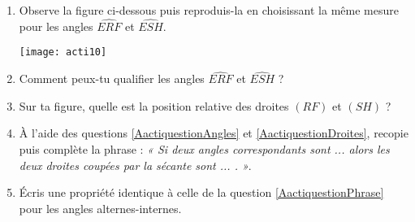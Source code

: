 \begin{activite}
\begin{enumerate}
\item Observe la figure ci-dessous puis reproduis-la en choisissant la même mesure pour les angles $\widehat{ERF}$ et $\widehat{ESH}$.

\begin{center}
\texttt{[image: acti10]}
\end{center}

\item\label{AactiquestionAngles} Comment peux-tu qualifier les angles $\widehat{ERF}$ et $\widehat{ESH}$ ? 
\item\label{AactiquestionDroites} Sur ta figure, quelle est la position relative des droites $(RF)$ et $(SH)$ ?
\item\label{AactiquestionPhrase} À l'aide des questions \ref{AactiquestionAngles} et \ref{AactiquestionDroites}, recopie puis complète la phrase : \textsl{« Si deux angles correspondants sont ... alors les deux droites coupées par la sécante sont ... . »}.
\item Écris une propriété identique à celle de la question \ref{AactiquestionPhrase} pour les angles alternes-internes.
\end{enumerate}
\end{activite}